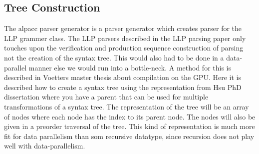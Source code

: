 \documentclass[a4paper,12pt]{article}
\theoremstyle{definition}
\begin{document}
\subsection{Tree Construction}
The alpacc parser generator is a parser generator which creates parser for the LLP grammer class. The LLP parsers described in the LLP parsing paper \cite{Vagner2007} only touches upon the verification and production sequence construction of parsing not the creation of the syntax tree. This would also had to be done in a data-parallel manner else we would run into a bottle-neck. A method for this is described in Voetters master thesis \cite[32-33]{voetter2021} about compilation on the GPU. Here it is described how to create a syntax tree using the representation from Hsu PhD dissertation \cite[77-81]{hsu2019} where you have a parent that can be used for multiple transformations of a syntax tree. The representation of the tree will be an array of nodes where each node has the index to its parent node. The nodes will also be given in a preorder traversal of the tree. This kind of representation is much more fit for data parallelism than som recursive datatype, since recursion does not play well with data-parallelism. 
\end{document}
